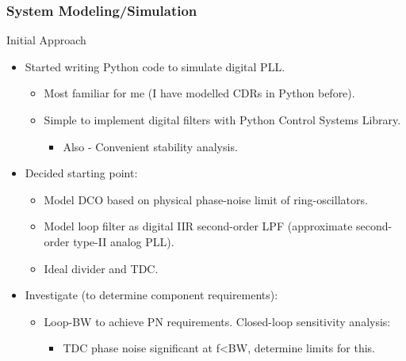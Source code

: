 \documentclass[t, screen, aspectratio=43]{beamer}
\begin{document}
\begin{frame}
	\frametitle{System Modeling/Simulation}
	\begin{block}{Initial Approach}
		\vspace{-.2em}
		\begin{itemize}
			\footnotesize
			\item Started writing Python code to simulate digital PLL.
			\begin{itemize}
				\footnotesize
				\item Most familiar for me (I have modelled CDRs in Python before).
				\item Simple to implement digital filters with Python Control Systems Library.
				\begin{itemize}
					\scriptsize
					\item Also - Convenient stability analysis.
				\end{itemize}
			\end{itemize}
			\footnotesize
			\item Decided starting point:
			\begin{itemize}
				\footnotesize
				\item Model DCO based on physical phase-noise limit of ring-oscillators. 
				\item Model loop filter as digital IIR second-order LPF (approximate second-order type-II analog PLL).
				\item Ideal divider and TDC.
			\end{itemize} 
			\item Investigate (to determine component requirements):
			\begin{itemize}
				\footnotesize
				\item Loop-BW to achieve PN requirements. Closed-loop sensitivity analysis:
				\begin{itemize}
					\scriptsize
					\item TDC phase noise significant at f<BW, determine limits for this. 
				\end{itemize}
			\end{itemize}
		\end{itemize}    
	\end{block}
\end{frame}

\end{document}
